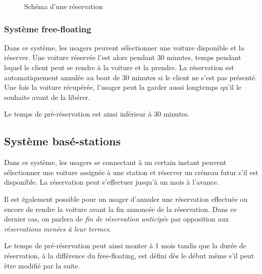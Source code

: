 \documentclass[12pt,a4paper]{article}
\newcommand{\1}[1]{\mathbbm{1}_{\{#1\}} }
\theoremstyle{definition}
\begin{document}
\begin{figure}[h]
\centering
{}
\caption{Schéma d'une réservation}
\end{figure}


\subsubsection{Système free-floating}

Dans ce système, les usagers peuvent sélectionner une voiture disponible et la réserver. Une voiture réservée l'est alors pendant 30 minutes, temps pendant lequel le client peut se rendre à la voiture et la prendre. La réservation est automatiquement annulée au bout de 30 minutes si le client ne s'est pas présenté. Une fois la voiture récupérée, l'usager peut la garder aussi longtemps qu'il le souhaite avant de la libérer.

Le temps de pré-réservation est ainsi inférieur à 30 minutes.

\subsection{Système basé-stations}

Dans ce système, les usagers se connectant à un certain instant peuvent sélectionner une voiture assignée à une station et réserver un créneau futur s'il est disponible. La réservation peut s'effectuer jusqu'à un mois à l'avance.

Il est également possible pour un usager d'annuler une réservation effectuée ou encore de rendre la voiture avant la fin annoncée de la réservation. Dans ce dernier cas, on parlera de \emph{fin de réservation anticipée} par opposition aux \emph{réservations menées à leur termes}.

Le temps de pré-réservation peut ainsi monter à 1 mois tandis que la durée de réservation, à la différence du free-floating, est défini dès le début même s'il peut être modifié par la suite.
\end{document}
